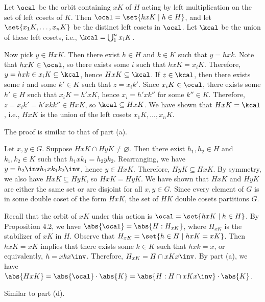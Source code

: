 \begin{solenum}
	\item Let $\ocal$ be the orbit containing $xK$ of $H$ acting by left multiplication on the set of left cosets of $K$.
	Then $\ocal = \set{hxK \mid h \in H}$, and let $\set{x_1K, \ldots, x_nK}$ be the distinct left cosets in $\ocal$.
	Let $\kcal$ be the union of these left cosets, i.e., $\kcal = \bigcup_1^n x_iK$.
	
	Now pick $y \in HxK$.
	Then there exist $h \in H$ and $k \in K$ such that $y = hxk$.
	Note that $hxK \in \ocal$, so there exists some $i$ such that $hxK = x_iK$.
	Therefore, $y = hxk \in x_iK \subseteq \kcal$, hence $HxK \subseteq \kcal$.
	If $z \in \kcal$, then there exists some $i$ and some $k' \in K$ such that $z = x_ik'$.
	Since $x_iK \in \ocal$, there exists some $h' \in H$ such that $x_iK = h'xK$, hence $x_i = h'xk''$ for some $k'' \in K$.
	Therefore, $z = x_ik' = h'xkk'' \in HxK$, so $\kcal \subseteq HxK$.
	We have shown that $HxK = \kcal$, i.e., $HxK$ is the union of the left cosets $x_1K, \ldots, x_nK$.
	\item The proof is similar to that of part (a). 
	\item Let $x, y \in G$.
	Suppose $HxK \cap HyK \neq \varnothing$.
	Then there exist $h_1, h_2 \in H$ and $k_1, k_2 \in K$ such that $h_1 x k_1 = h_2 y k_2$.
	Rearranging, we have $y = h_2\inv h_1 x k_1 k_2\inv$, hence $y \in HxK$.
	Therefore, $HyK \subseteq HxK$.
	By symmetry, we also have $HxK \subseteq HyK$, so $HxK = HyK$.
	We have shown that $HxK$ and $HyK$ are either the same set or are disjoint for all $x, y \in G$.
	Since every element of $G$ is in some double coset of the form $HxK$, the set of $HK$ double cosets partitions $G$.
	\item Recall that the orbit of $xK$ under this action is $\ocal = \set{hxK \mid h \in H}$.
	By Proposition 4.2, we have $\abs{\ocal} = \abs{H : H_{xK}}$, where $H_{xK}$ is the stabilizer of $xK$ in $H$.
	Observe that $H_{xK} = \set{h \in H \mid hxK = xK}$.
	Then $hxK = xK$ implies that there exists some $k \in K$ such that $hxk = x$, or equivalently, $h = x k x\inv$.
	Therefore, $H_{xK} = H \cap x K x\inv$.
	By part (a), we have $\abs{HxK} = \abs{\ocal} \cdot \abs{K} = \abs{H : H \cap x K x\inv} \cdot \abs{K}$.
	\item Similar to part (d).
\end{solenum}